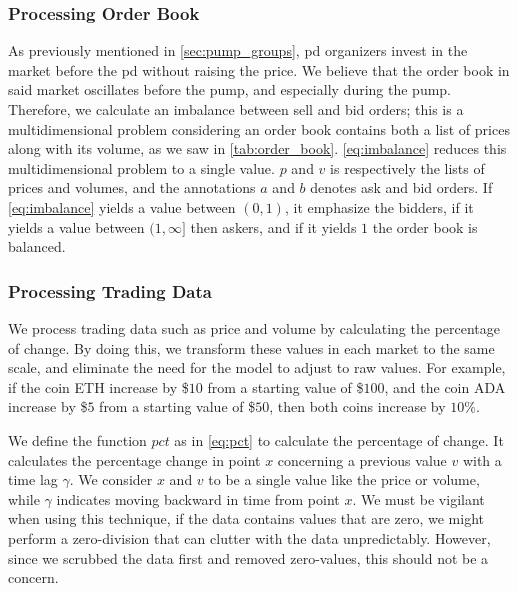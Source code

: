 \subsubsection{Processing Order Book}
As previously mentioned in \autoref{sec:pump_groups}, \ac{pd} organizers invest in the market before the \ac{pd} without raising the price. We believe that the order book in said market oscillates before the pump, and especially during the pump. Therefore, we calculate an imbalance between sell and bid orders; this is a multidimensional problem considering an order book contains both a list of prices along with its volume, as we saw in \autoref{tab:order_book}. \autoref{eq:imbalance} reduces this multidimensional problem to a single value. $p$ and $v$ is respectively the lists of prices and volumes, and the annotations $a$ and $b$ denotes ask and bid orders. If \autoref{eq:imbalance} yields a value between $(0,1)$, it emphasize the bidders, if it yields a value between $(1, \infty]$ then askers, and if it yields $1$ the order book is balanced.



\subsubsection{Processing Trading Data}
We process trading data such as price and volume by calculating the percentage of change. By doing this, we transform these values in each market to the same scale, and eliminate the need for the model to adjust to raw values. For example, if the coin ETH increase by \$$10$ from a starting value of \$$100$, and the coin ADA increase by \$$5$ from a starting value of \$$50$, then both coins increase by $10$\%.



We define the function $pct$ as in \autoref{eq:pct} to calculate the percentage of change. It calculates the percentage change in point $x$ concerning a previous value $v$ with a time lag $\gamma$. We consider $x$ and $v$ to be a single value like the price or volume, while $\gamma$ indicates moving backward in time from point $x$. We must be vigilant when using this technique, if the data contains values that are zero, we might perform a zero-division that can clutter with the data unpredictably. However, since we scrubbed the data first and removed zero-values, this should not be a concern.

